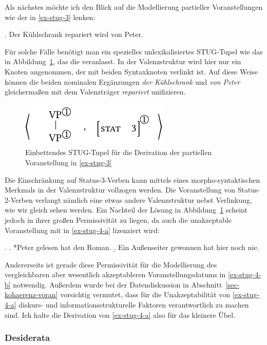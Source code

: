 Als nächstes möchte ich den Blick auf die Modellierung partieller Voranstellungen wie der in \ref{ex-stug-3} lenken: 

\ex. \label{ex-stug-3}Der Kühlschrank repariert wird von Peter.

Für solche Fälle benötigt man ein spezielles unlexikalisiertes STUG-Tupel wie das in Abbildung~\ref{fig-stug-6}, das die  veranlasst. In der Valenzstruktur wird hier nur ein Knoten angenommen, der mit beiden Syntaxknoten verlinkt ist. Auf diese Weise können die beiden nominalen Ergänzungen {\it der Kühlschrank} und {\it von Peter} gleicherma\ss en mit dem Valenzträger {\it repariert} unifizieren.
\begin{figure}[t]
\centering
\includegraphics{graphics/abb96.pdf}
\caption{\label{fig-stug-6}Einbettendes STUG-Tupel für die Derivation der partiellen Voranstellung in \ref{ex-stug-3}}
\end{figure}
Die Einschränkung auf Status-3-Verben kann mittels eines morpho-syntaktischen Merkmals in der Valenzstruktur vollzogen werden. Die Voranstellung von Status-2-Verben verlangt nämlich eine etwas andere Valenzstruktur nebst Verlinkung, wie wir gleich sehen werden. Ein Nachteil der Lösung in Abbildung~\ref{fig-stug-6} scheint jedoch in ihrer gro\ss en Permissivität zu liegen, da auch die unakzeptable Voranstellung mit  in \ref{ex-stug-4-a} lizenziert wird:   

\ex. \label{ex-stug-4}
\a. *Peter gelesen hat den Roman. \hfill \citep[Figure~6]{Gerdes:04}\label{ex-stug-4-a}
\b. Ein Au\ss enseiter gewonnen hat hier noch nie. \hfill \citep[10-d]{Haider:90}\label{ex-stug-4-b}

Andererseits ist gerade diese Permissivität für die Modellierung des vergleichbaren aber wesentlich akzeptableren Voranstellungsdatums in \ref{ex-stug-4-b} notwendig. Au\ss erdem wurde bei der Datendiskussion in Abschnitt~\ref{sec-kohaerenz-voran} vorsichtig vermutet, dass für die Unakzeptabilität von \ref{ex-stug-4-a} diskurs- und informationsstrukturelle Faktoren verantwortlich zu machen sind. Ich halte die Derivation von \ref{ex-stug-4-a} also für das kleinere Übel.

\subsubsection*{Desiderata}

